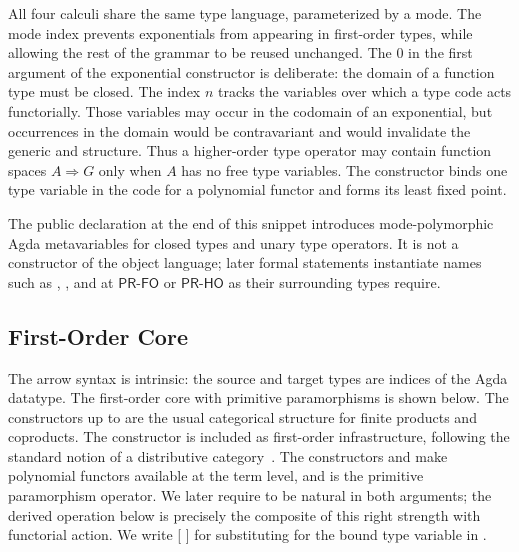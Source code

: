 \documentclass[sigplan,10pt,anonymous,review,screen]{acmart}
\newcommand{\PRFO}{\ensuremath{\mathsf{PR\mbox{-}FO}}}
\newcommand{\PRHO}{\ensuremath{\mathsf{PR\mbox{-}HO}}}
\begin{document}
All four calculi share the same type language, parameterized by a mode.
The mode index  prevents exponentials from appearing in first-order
types, while allowing the rest of the grammar to be reused unchanged.
The \(0\) in the first argument of the exponential constructor is
deliberate: the domain of a function type must be closed.  The index
\(n\) tracks the variables over which a type code acts functorially.
Those variables may occur in the codomain of an exponential, but
occurrences in the domain would be contravariant and would invalidate
the generic  and
 structure.  Thus a higher-order
type operator may contain function spaces \(A \Rightarrow G\) only when
\(A\) has no free type variables.
The constructor  binds one type variable
in the code for a polynomial functor and forms its least fixed point.

{\small
\CoreTypesGrammar*
}

The public  declaration at the end of this snippet
introduces mode-polymorphic Agda metavariables for closed types and unary
type operators.  It is not a constructor of the object language; later
formal statements instantiate names such as ,
, and  at \PRFO{} or \PRHO{} as their
surrounding types require.

\subsection{First-Order Core}
\label{sec:core-calculi-fo}

The arrow syntax is intrinsic: the source and target types are indices
of the Agda datatype.  The first-order core with primitive paramorphisms
is shown below.  The constructors up to 
are the usual categorical structure for finite products and coproducts.
The constructor  is included as
first-order infrastructure, following the standard notion of a
distributive category~\cite{cockett_1993}.  The constructors
 and 
make polynomial functors available at the term level, and
 is the primitive paramorphism operator.  We
later require  to be natural in both
arguments; the derived operation  below is precisely
the composite of this right strength with functorial action.  We write
\AgdaSpace{}[ \AgdaSpace{}] for
substituting  for the bound type variable in
.
\end{document}
